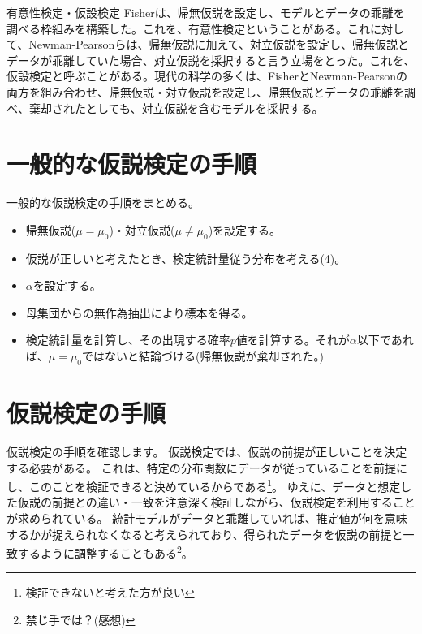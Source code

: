 \begin{SMbox}{有意性検定・仮設検定}
    Fisherは、帰無仮説を設定し、モデルとデータの乖離を調べる枠組みを構築した。これを、有意性検定ということがある。これに対して、Newman-Pearsonらは、帰無仮説に加えて、対立仮説を設定し、帰無仮説とデータが乖離していた場合、対立仮説を採択すると言う立場をとった。これを、仮設検定と呼ぶことがある。現代の科学の多くは、FisherとNewman-Pearsonの両方を組み合わせ、帰無仮説・対立仮説を設定し、帰無仮説とデータの乖離を調べ、棄却されたとしても、対立仮説を含むモデルを採択する。
\end{SMbox}
    

\section{一般的な仮説検定の手順}
一般的な仮説検定の手順をまとめる。
%
\begin{framed}
    \begin{itemize}
        \item 帰無仮説($\mu = \mu_0$)・対立仮説($\mu\neq \mu_0$)を設定する。
        \item 仮説が正しいと考えたとき、検定統計量従う分布を考える(4)。
        \item $\alpha$を設定する。
        \item 母集団からの無作為抽出により標本を得る。
        \item 検定統計量を計算し、その出現する確率$p$値を計算する。それが$\alpha$以下であれば、$\mu=\mu_0$ではないと結論づける(帰無仮説が棄却された。)
    \end{itemize}
\end{framed}


\section{仮説検定の手順}
仮説検定の手順を確認します。
仮説検定では、仮説の前提が正しいことを決定する必要がある。
これは、特定の分布関数にデータが従っていることを前提にし、このことを検証できると決めているからである\footnote{検証できないと考えた方が良い}。%
ゆえに、データと想定した仮説の前提との違い・一致を注意深く検証しながら、仮説検定を利用することが求められている。
統計モデルがデータと乖離していれば、推定値が何を意味するかが捉えられなくなると考えられており、得られたデータを仮説の前提と一致するように調整することもある\footnote{禁じ手では？(感想)}。

